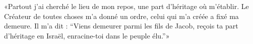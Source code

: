 «Partout j’ai cherché le lieu de mon repos,
    une part d’héritage où m’établir.
Le Créateur de toutes choses m’a donné un ordre,
    celui qui m’a créée a fixé ma demeure.
Il m’a dit : “Viens demeurer parmi les fils de Jacob,
    reçois ta part d’héritage en Israël, enracine-toi dans le peuple élu.”»
